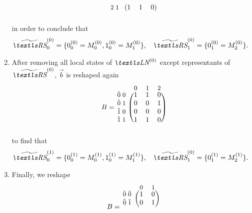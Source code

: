 \begin{runningExample}
\begin{enumerate}
\begin{equation}
\begin{blockarray}{r*{2}{@{\mkern5mu}>{$\bgroup\small$}c<{$\egroup$}}*{3}{>{$\bgroup\small$}c<{$\egroup$}}}
\begin{block}{r*{2}{@{\mkern5mu}>{$\bgroup\small$}c<{$\egroup$}}(*{3}{c})}
          & 2 & 1 & 1 & 1 & 0 \\
        \end{block}
      \end{blockarray}
    \end{equation}
    in order to conclude that
    \begin{align}
      \loc{\Macro{\RS}}{0}_0
      &= \{ \loc{0}{0}_0 = \loc{M}{0}_0, \loc{1}{0}_0 = \loc{M}{0}_1 \},
      &\loc{\Macro{\RS}}{0}_1
      &= \{ \loc{0}{0}_1 = \loc{M}{0}_2 \}.
    \end{align}
  \item After removing all local states of $\LN{0}$ except
    representants of $\loc{\Macro{\RS}}{0}$, $\vec{b}$ is reshaped
    again
    \begin{equation}
      \begin{blockarray}{r*{2}{@{\mkern5mu}>{$\bgroup\small$}c<{$\egroup$}}*{3}{>{$\bgroup\small$}c<{$\egroup$}}}
        & & & 0 & 1 & 2 \\[-0.5ex]
        \begin{block}{r*{2}{@{\mkern5mu}>{$\bgroup\small$}c<{$\egroup$}}(*{3}{c})}
          \multirow{4}{*}{$B =\,$} & \macro{0} & 0 & 1 & 1 & 0 \\
          & \macro{0} & 1 & 0 & 0 & 1 \\
          & \macro{1} & 0 & 0 & 0 & 0 \\
          & \macro{1} & 1 & 1 & 1 & 0 \\
      \end{blockarray}
    \end{equation}
    to find that
    \begin{align}
      \loc{\Macro{\RS}}{1}_0
      &= \{ \loc{0}{1}_0 = \loc{M}{1}_0, \loc{1}{1}_0 = \loc{M}{1}_1 \},
      &\loc{\Macro{\RS}}{0}_1
      &= \{ \loc{0}{1}_1 = \loc{M}{1}_2 \}.
    \end{align}
  \item Finally, we reshape
    \begin{equation}
      \begin{blockarray}{r*{2}{@{\mkern5mu}>{$\bgroup\small$}c<{$\egroup$}}*{2}{>{$\bgroup\small$}c<{$\egroup$}}}
        & & & 0 & 1\\[-0.5ex]
        \begin{block}{r*{2}{@{\mkern5mu}>{$\bgroup\small$}c<{$\egroup$}}(*{2}{c})}
          \multirow{4}{*}{$B =\,$} & \macro{0} & \macro{0} & 1 & 0 \\
          & \macro{0} & \macro{1} & 0 & 1 \\

\end{block}
\end{blockarray}
\end{equation}
\end{enumerate}
\end{runningExample}
